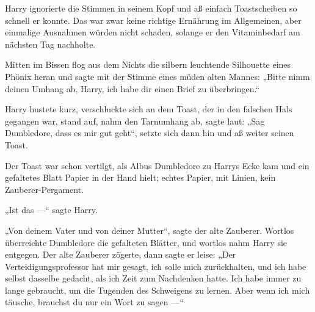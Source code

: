 Harry ignorierte die Stimmen in seinem Kopf und aß einfach Toastscheiben so schnell er konnte. Das war zwar keine richtige Ernährung im Allgemeinen, aber einmalige Ausnahmen würden nicht schaden, solange er den Vitaminbedarf am nächsten Tag nachholte.

Mitten im Bissen flog aus dem Nichts die silbern leuchtende Silhouette eines Phönix heran und sagte mit der Stimme eines müden alten Mannes:
„Bitte nimm deinen Umhang ab, Harry, ich habe dir einen Brief zu überbringen.“

Harry hustete kurz, verschluckte sich an dem Toast, der in den falschen Hals gegangen war, stand auf, nahm den Tarnumhang ab, sagte laut:
„Sag Dumbledore, dass es mir gut geht“, setzte sich dann hin und aß weiter seinen Toast.

Der Toast war schon vertilgt, als Albus Dumbledore zu Harrys Ecke kam und ein gefaltetes Blatt Papier in der Hand hielt; echtes Papier, mit Linien, kein Zauberer-Pergament.

„Ist das —“ sagte Harry.

„Von deinem Vater und von deiner Mutter“, sagte der alte Zauberer. Wortlos überreichte Dumbledore die gefalteten Blätter, und wortlos nahm Harry sie entgegen. Der alte Zauberer zögerte, dann sagte er leise:
„Der Verteidigungsprofessor hat mir gesagt, ich solle mich zurückhalten, und ich habe selbst dasselbe gedacht, als ich Zeit zum Nachdenken hatte. Ich habe immer zu lange gebraucht, um die Tugenden des Schweigens zu lernen. Aber wenn ich mich täusche, brauchst du nur ein Wort zu sagen —“

